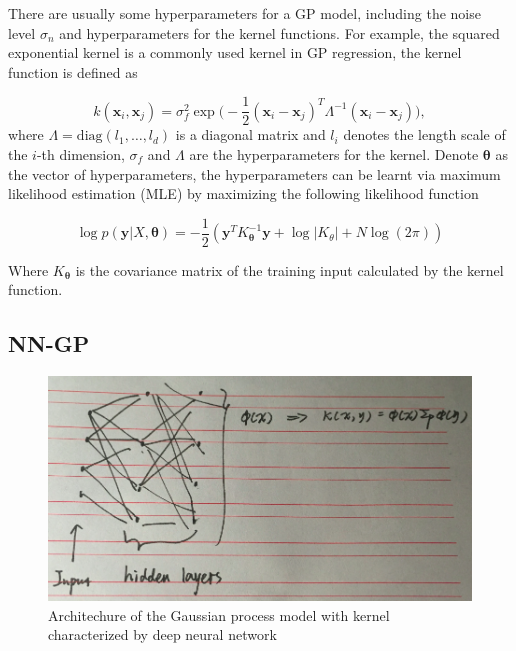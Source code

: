 There are usually some hyperparameters for a GP model, including the noise level $\sigma_n$ and hyperparameters for the kernel functions. For example, the squared exponential kernel is a commonly used kernel in GP regression, the kernel function is defined as

\begin{equation}
    \label{eq:GaussianCovarianceFunction}
    k(\bm{x}_i, \bm{x}_j) = \sigma_f^2 \exp\Big(-\frac{1}{2}(\bm{x}_i - \bm{x}_j)^T\Lambda^{-1}(\bm{x}_i - \bm{x}_j)\Big),
\end{equation}
where $\Lambda = \mathrm{diag}(l_1, \dots, l_d)$ is a diagonal matrix and $l_i$ denotes the length scale of the $i$-th dimension, $\sigma_f$ and $\Lambda$ are the hyperparameters for the kernel. Denote $\bm{\theta}$ as the vector of hyperparameters, the hyperparameters can be learnt via maximum likelihood estimation (MLE) by maximizing the following likelihood function

\begin{equation}
    \label{eq:GPloglikelihood}
    \log p(\bm{y} | X, \bm{\theta}) = -\frac{1}{2}(\bm{y}^T K_{\bm{\theta}}^{-1} \bm{y} + \log |K_{\theta}| + N \log(2 \pi))
\end{equation}

Where $K_{\bm{\theta}}$ is the covariance matrix of the training input calculated by the kernel function.

\subsection{NN-GP}\label{sec:NNGP}

\begin{figure}[!htb]
    \centering
    \includegraphics[width=\columnwidth]{./img/NN-GP.png}
    \caption{Architechure of the Gaussian process model with kernel characterized by deep neural network}
    \label{fig:NNGP}
\end{figure}

